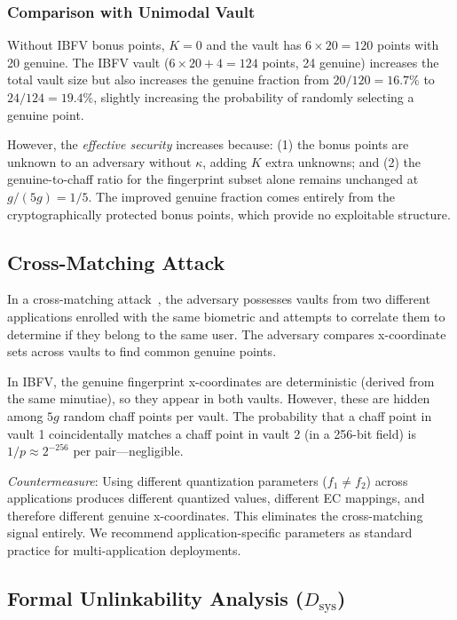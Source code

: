 \documentclass[3p,twocolumn]{elsarticle}
\newcommand{\IBFV}{\textsf{IBFV}}
\begin{document}
\subsubsection{Comparison with Unimodal Vault}
Without \IBFV{} bonus points, $K = 0$ and the vault has $6 \times 20 = 120$ points with 20 genuine. The IBFV vault ($6 \times 20 + 4 = 124$ points, 24 genuine) increases the total vault size but also increases the genuine fraction from $20/120 = 16.7\%$ to $24/124 = 19.4\%$, slightly increasing the probability of randomly selecting a genuine point.

However, the \emph{effective security} increases because: (1) the bonus points are unknown to an adversary without $\kappa$, adding $K$ extra unknowns; and (2) the genuine-to-chaff ratio for the fingerprint subset alone remains unchanged at $g/(5g) = 1/5$. The improved genuine fraction comes entirely from the cryptographically protected bonus points, which provide no exploitable structure.

\subsection{Cross-Matching Attack}
\label{sec:cross_matching}

In a cross-matching attack~\cite{tams2013attacks}, the adversary possesses vaults from two different applications enrolled with the same biometric and attempts to correlate them to determine if they belong to the same user. The adversary compares x-coordinate sets across vaults to find common genuine points.

In \IBFV{}, the genuine fingerprint x-coordinates are deterministic (derived from the same minutiae), so they appear in both vaults. However, these are hidden among $5g$ random chaff points per vault. The probability that a chaff point in vault 1 coincidentally matches a chaff point in vault 2 (in a 256-bit field) is $1/p \approx 2^{-256}$ per pair---negligible.

\emph{Countermeasure}: Using different quantization parameters ($f_1 \neq f_2$) across applications produces different quantized values, different EC mappings, and therefore different genuine x-coordinates. This eliminates the cross-matching signal entirely. We recommend application-specific parameters as standard practice for multi-application deployments.

\subsection{Formal Unlinkability Analysis ($D_{\text{sys}}$)}
\label{sec:dsys}
\end{document}
